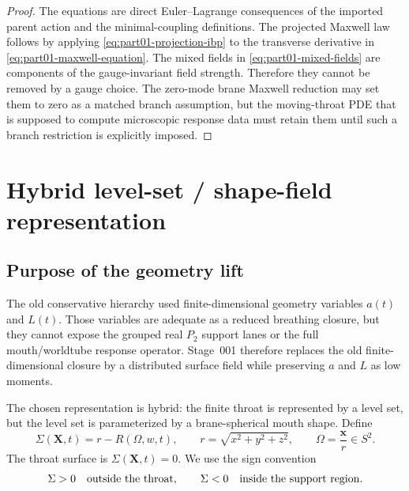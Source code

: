 \begin{proof}
The equations are direct Euler--Lagrange consequences of the imported parent action and the minimal-coupling definitions.  The projected Maxwell law follows by applying \eqref{eq:part01-projection-ibp} to the transverse derivative in \eqref{eq:part01-maxwell-equation}.  The mixed fields in \eqref{eq:part01-mixed-fields} are components of the gauge-invariant field strength.  Therefore they cannot be removed by a gauge choice.  The zero-mode brane Maxwell reduction may set them to zero as a matched branch assumption, but the moving-throat PDE that is supposed to compute microscopic response data must retain them until such a branch restriction is explicitly imposed.
\end{proof}

\section{Hybrid level-set / shape-field representation}
\label{sec:part01_parent_geometry:hybrid-level-set-shape-field-representation}

\subsection{Purpose of the geometry lift}
\label{subsec:part01-geometry-lift-purpose}

The old conservative hierarchy used finite-dimensional geometry variables \(a(t)\) and \(L(t)\).  Those variables are adequate as a reduced breathing closure, but they cannot expose the grouped real \(P_2\) support lanes or the full mouth/worldtube response operator.  Stage~001 therefore replaces the old finite-dimensional closure by a distributed surface field while preserving \(a\) and \(L\) as low moments.

The chosen representation is hybrid: the finite throat is represented by a level set, but the level set is parameterized by a brane-spherical mouth shape.  Define
\begin{equation}
\label{eq:part01-hybrid-lift}
\boxed{
\Sigma(\mathbf X,t)=r-R(\Omega,w,t),
\qquad
r=\sqrt{x^2+y^2+z^2},
\qquad
\Omega=\frac{\mathbf x}{r}\in S^2}.
\end{equation}
The throat surface is \(\Sigma(\mathbf X,t)=0\).  We use the sign convention
\begin{equation}
\Sigma>0 \quad\hbox{outside the throat},
\qquad
\Sigma<0 \quad\hbox{inside the support region}.
\end{equation}

